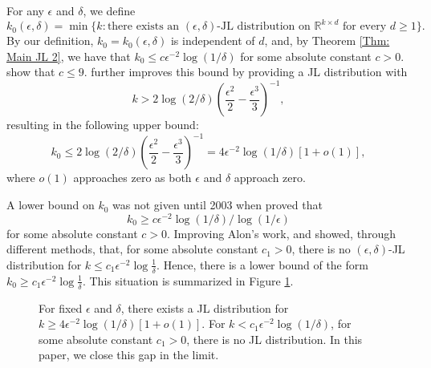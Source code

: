 \documentclass[twoside,11pt]{article}
\newcommand{\R}{{\mathbb R}}
\begin{document}
For any $\epsilon$ and $\delta$, we define
\[k_0(\epsilon,\delta) = \min \{k:  \mbox{there exists an $(\epsilon, \delta)$-JL distribution on $\R^{k\times d}$ for every  $d\geq 1$} \}.   \]
By our definition,  $k_0= k_0(\epsilon,\delta)$ is independent of $d$, and, by  Theorem \ref{Thm: Main JL 2},  we have that $k_0 \leq c \epsilon^{-2} \log(1/\delta)$ for some absolute constant $c>0$.  
 \cite{FranklMaehara}  show that $c \leq 9$. 
\cite{Achlioptas} further improves  this bound by providing a JL distribution with
			\[k> 2 \log(2/\delta) \left(\frac{\epsilon^2}{2} - \frac{\epsilon^3}{3} \right)^{-1} ,\]
resulting in the following upper bound:
\[k_0  \leq  2 \log(2/\delta) \left(\frac{\epsilon^2}{2} - \frac{\epsilon^3}{3} \right)^{-1} = 4\epsilon^{-2} \log(1/\delta) \left[ 1+ o(1) \right],\]
		where $o(1)$ approaches zero as both $\epsilon$ and $\delta$ approach zero.	
		
A lower bound on $k_0$ was not given until 2003 when \cite{Alon} proved that 
					\[k_0 \geq c \epsilon^{-2} \log(1/\delta) \Big/ \log(1/\epsilon) \] 
for some absolute constant $c>0$.	Improving Alon's work, \cite{WoodruffJayram} and  \cite{KaneNelsonMeka}  
showed, through different methods, that, for some absolute constant $c_1>0$,  there is no $(\epsilon,\delta)$-JL distribution for 
$k \leq c_1\epsilon^{-2} \log \frac{1}{\delta}$.  Hence,  there is a lower bound of the form
$k_0 \geq c_1  \epsilon^{-2} \log \frac{1}{\delta}$. This situation is summarized in Figure \ref{Figure:Line}.
		\begin{figure}[bt]
		\begin{center}
		\caption{For fixed $\epsilon$ and $\delta$, there exists a JL distribution for $k \geq 4 \epsilon^{-2} \log(1/\delta)\left[ 1+ o(1) 
		\right]$. For $k<c_1 \epsilon^{-2} \log(1/\delta)$, for some absolute  constant $c_1>0$,  there is no JL distribution.  In this paper, we close this gap in the limit.
		\label{Figure:Line}}
		\end{center}
\end{figure}	
		
\end{document}
